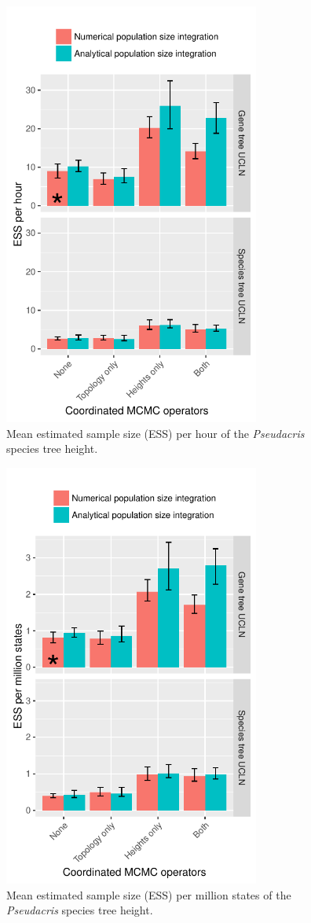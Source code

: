 \documentclass[12pt]{article}
\begin{document}
\begin{figure}[htb!]
\centering
\includegraphics[height=14cm]{speciesTreeHeight_ess_per_hour.pdf}
\caption
{Mean estimated sample size (ESS) per hour of the \textit{Pseudacris} species tree height.}
\label{fig:realEssPerHour}
\end{figure}

\clearpage

\begin{figure}[htb!]
\centering
\includegraphics[height=14cm]{speciesTreeHeight_ess_per_mstates.pdf}
\caption
{Mean estimated sample size (ESS) per million states of the \textit{Pseudacris} species tree height.}
\label{fig:realEssPerMstates}
\end{figure}
\end{document}
